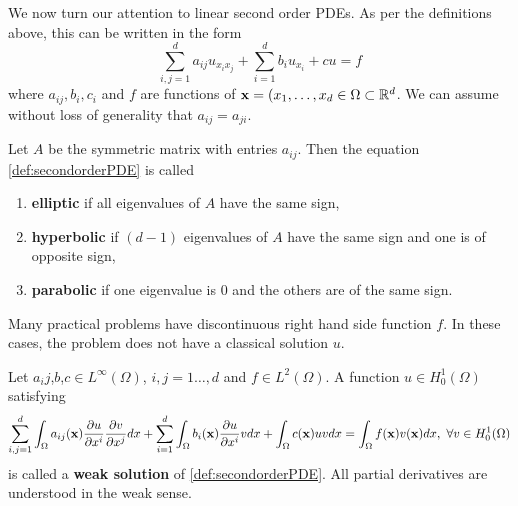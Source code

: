 We now turn our attention to linear second order PDEs. As per the definitions above, this can be written in the form 
\begin{equation}\label{def:secondorderPDE}
\sum_{i,j = 1}^d a_{ij} u_{x_i x_j} + \sum_{i=1}^d b_i u_{x_i} + cu = f
\end{equation}
where $a_{ij}, b_i, c_i$ and $f$ are functions of ${\mathbf{x}} = (x_1,\ldots, x_d \in \Omega \subset \mathbb{R}^d$. We can assume without loss of generality that $a_{ij}=a_{ji}$. 

\begin{defn}
Let $A$ be the symmetric matrix with entries $a_{ij}$. Then the equation \ref{def:secondorderPDE} is called
\begin{enumerate}
\item \textbf{elliptic} if all eigenvalues of $A$ have the same sign,
\item \textbf{hyperbolic} if $(d-1)$ eigenvalues of $A$ have the same sign and one is of opposite sign,
\item \textbf{parabolic} if one eigenvalue is $0$ and the others are of the same sign.
\end{enumerate}
\end{defn}

Many practical problems have discontinuous right hand side function $f$. In these cases, the problem does not have a classical solution $u$.

\begin{defn}
Let $a_ij$,$b$,$c \in L^{\infty}(\Omega)$, $i,j = 1\ldots, d$ and $f \in L^2(\Omega)$. A function $u \in H^1_0(\Omega)$ satisfying
\[ \sum^d_{i,j=1} \int_{\Omega} a_{ij}(\mathbf{x}) \frac{{\partial} u}{{\partial} x^i}\frac{{\partial} v}{{\partial} x^j}dx + \sum^d_{i=1} \int_{\Omega} b_{i}(\mathbf{x}) \frac{{\partial} u}{{\partial} x^i}vdx+ \int_{\Omega} c(\mathbf{x})u v dx = \int_{\Omega} f(\mathbf{x})v(\mathbf{x})dx, \mbox{  } \forall v \in H^1_0(\Omega)\]
is called a \textbf{weak solution} of \ref{def:secondorderPDE}. All partial derivatives are understood in the weak sense.
\end{defn}

